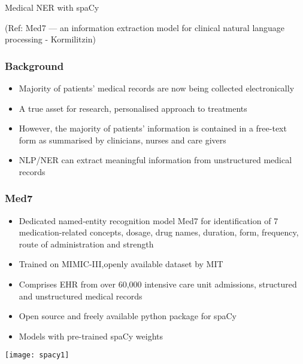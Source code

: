 \begin{frame}[fragile]\frametitle{}

\begin{center}
{\Large Medical NER with spaCy}

{\tiny (Ref: Med7 — an information extraction model for clinical natural language processing - Kormilitzin)}
\end{center}


\end{frame}


\begin{frame}[fragile]\frametitle{Background}
  \begin{itemize}
  \item Majority of patients' medical records are now being collected electronically
	\item A true asset for research, personalised approach to treatments
	\item However, the majority of patients’ information is contained in a free-text form as summarised by clinicians, nurses and care givers
	\item NLP/NER can extract meaningful information from unstructured medical records
  \end{itemize}
	
\end{frame}

\begin{frame}[fragile]\frametitle{Med7}
  \begin{itemize}
  \item Dedicated named-entity recognition model Med7 for identification of 7 medication-related concepts, dosage, drug names, duration, form, frequency, route of administration and strength
	\item Trained on MIMIC-III,openly available dataset by MIT
	\item Comprises EHR from over 60,000 intensive care unit admissions, structured and unstructured medical records
	\item Open source and freely available python package for spaCy
	\item Models with pre-trained spaCy weights
  \end{itemize}
	

\begin{center}
\texttt{[image: spacy1]}
\end{center}

	
\end{frame}


